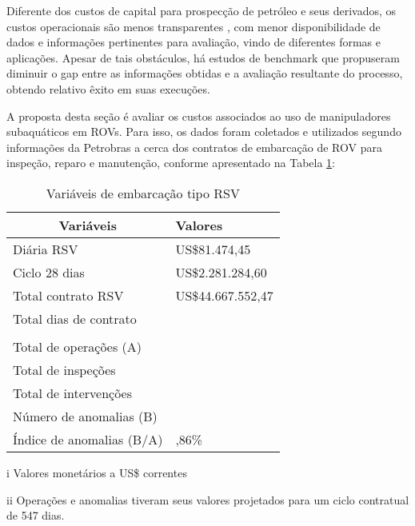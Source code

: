 Diferente dos custos de capital para prospecção de petróleo e seus derivados, os custos operacionais são menos transparentes , com menor disponibilidade de dados e informações pertinentes para avaliação, vindo de diferentes formas e aplicações. Apesar de tais obstáculos, há estudos de benchmark que propuseram diminuir o gap entre as informações obtidas e a avaliação resultante do processo, obtendo relativo êxito em suas execuções. 

A proposta desta seção é avaliar os custos associados ao uso de manipuladores subaquáticos em ROVs. Para isso, os dados foram coletados e utilizados segundo informações da Petrobras a cerca dos contratos de embarcação de ROV para inspeção, reparo e manutenção, conforme apresentado na Tabela \ref{tab:cost1}:

\begin{table}[h!]
    \centering
	\begin{threeparttable}
	\centering
	\caption{Variáveis de embarcação tipo RSV}
	\label{tab:cost1}
    \begin{tabular}{p{8cm} >{\centering\arraybackslash}m{3.7cm}}
		\hline
		\multicolumn{1}{c}{\textbf{Variáveis}} & \textbf{Valores}\tnote{i}  \\ \hline
		Diária RSV                              & US\$81.474,45     \\
		Ciclo 28 dias                          & US\$2.281.284,60  \\
		Total contrato RSV                     & US\$44.667.552,47 \\
		Total dias de contrato                 & 547               \\
		&                   \\
		Total de operações (A)\tnote{ii}                 & 1976              \\
		Total de inspeções                     & 1337              \\
		Total de intervenções                  & 639               \\
		Número de anomalias (B)                & 432               \\
		Índice de anomalias (B/A)              & 21,86\%           \\ \hline
	\end{tabular}
\begin{tablenotes}
\item[i]{Valores monetários a US\$ correntes}
\item[ii]{Operações e anomalias tiveram seus valores projetados para um ciclo contratual de 547 dias.}
\end{tablenotes}
\end{threeparttable}
\end{table}


